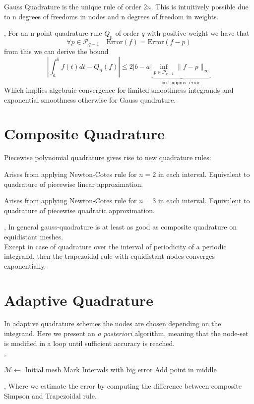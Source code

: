 \Lemma[Order] Gauss Quadrature is the unique rule of order $2n$. This is intuitively possible due to n degrees of freedoms in nodes and n degrees of freedom in weights. 

\sep
For an n-point quadrature rule $Q_n$ of order $q$ with positive weight we have that
$$ \forall p \in \mathcal{P}_{q-1} \quad \text{Error}(f) = \text{Error}(f-p)$$ 
from this we can derive the bound
$$ {
\left|\int_{a}^{b} f(t) d t-Q_{n}(f)\right| \leq 2|b-a| \underbrace{\inf _{p \in \mathcal{P}_{q-1}}\|f-p\|_{\infty}}_{\text {best approx. error }}}
$$
Which implies algebraic convergence for limited smoothness integrands and exponential smoothness otherwise for Gauss quadrature.


\section{Composite Quadrature}
Piecewise polynomial quadrature gives rise to new quadrature rules:

Arises from applying Newton-Cotes rule for $n=2$ in each interval. Equivalent to quadrature of piecewise linear approximation.

Arises from applying Newton-Cotes rule for $n=3$ in each interval. Equivalent to quadrature of piecewise quadratic approximation.

\sep
In general gauss-quadrature is at least as good as composite quadrature on equidistant meshes.\\
Except in case of quadrature over the interval of periodicity of a periodic integrand, then the trapezoidal rule with equidistant nodes converges exponentially.


\section{Adaptive Quadrature}
In adaptive quadrature schemes the nodes are chosen depending on the integrand. Here we present an \textit{a posteriori} algorithm, meaning that the node-set is modified in a loop until sufficient accuracy is reached. \\

\sep
\begin{algorithmic}
\State $\mathcal{M} \gets$ Initial mesh
	\State Mark Intervals with big error
		\State Add point in middle
	\EndFor
\EndWhile
\end{algorithmic}
\sep
Where we estimate the error by computing the difference between composite Simpson and Trapezoidal rule.

